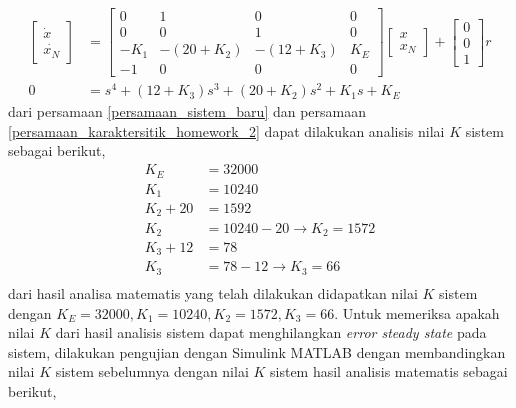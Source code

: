 \documentclass[../main.tex]{subfiles}
\begin{document}
            \begin{equation}
                \begin{split}
                    \begin{bmatrix} \dot{x} \\ \dot{x_N} \end{bmatrix} &= \begin{bmatrix} 0 & 1 & 0 & 0 \\ 0 & 0 & 1 & 0 \\ -K_1 & -(20 + K_2) & -(12 + K_3) & K_E \\ -1 & 0 & 0 & 0 \end{bmatrix}\begin{bmatrix} x \\ x_N \end{bmatrix} + \begin{bmatrix} 0 \\ 0 \\ 1 \end{bmatrix} r \\[10pt]
                    0 &= s^4 + (12 + K_3)s^3 + (20 + K_2)s^2 + K_1s + K_E
                    \label{persamaan_karaktersitik_homework_2}
                \end{split}
            \end{equation}
            dari persamaan \eqref{persamaan_sistem_baru} dan persamaan \eqref{persamaan_karaktersitik_homework_2} dapat dilakukan analisis nilai $K$ sistem sebagai berikut,
            \begin{equation}
                \begin{split}
                    K_E &= 32000 \\[10pt]
                    K_1 &= 10240 \\[10pt]
                    K_2 + 20 &= 1592 \\[5pt]
                    K_2 &= 10240 - 20 \rightarrow K_2 = 1572 \\[10pt]
                    K_3 + 12 &= 78 \\[5pt]
                    K_3 &= 78 - 12 \rightarrow K_3 = 66 \\[10pt]
                \end{split}
            \end{equation}
            dari hasil analisa matematis yang telah dilakukan didapatkan nilai $K$ sistem dengan $K_E = 32000, K_1 = 10240, K_2 = 1572, K_3 = 66$. Untuk memeriksa apakah nilai $K$ dari hasil analisis sistem dapat menghilangkan \textit{error steady state} pada sistem, dilakukan pengujian dengan Simulink MATLAB dengan membandingkan nilai $K$ sistem sebelumnya dengan nilai $K$ sistem hasil analisis matematis sebagai berikut,
\end{document}

